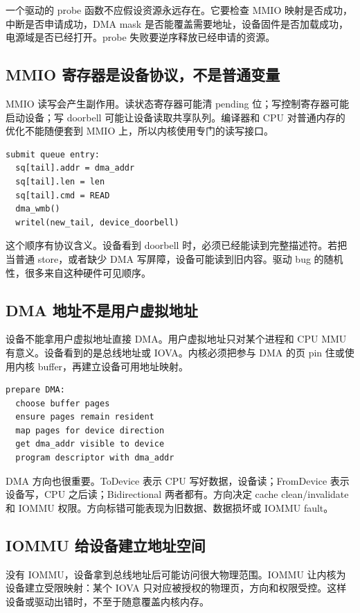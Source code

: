 一个驱动的 probe 函数不应假设资源永远存在。它要检查 MMIO 映射是否成功，中断是否申请成功，DMA mask 是否能覆盖需要地址，设备固件是否加载成功，电源域是否已经打开。probe 失败要逆序释放已经申请的资源。

\subsection{MMIO 寄存器是设备协议，不是普通变量}

MMIO 读写会产生副作用。读状态寄存器可能清 pending 位；写控制寄存器可能启动设备；写 doorbell 可能让设备读取共享队列。编译器和 CPU 对普通内存的优化不能随便套到 MMIO 上，所以内核使用专门的读写接口。

\begin{lstlisting}
submit queue entry:
  sq[tail].addr = dma_addr
  sq[tail].len = len
  sq[tail].cmd = READ
  dma_wmb()
  writel(new_tail, device_doorbell)
\end{lstlisting}

这个顺序有协议含义。设备看到 doorbell 时，必须已经能读到完整描述符。若把  当普通 store，或者缺少 DMA 写屏障，设备可能读到旧内容。驱动 bug 的随机性，很多来自这种硬件可见顺序。

\subsection{DMA 地址不是用户虚拟地址}

设备不能拿用户虚拟地址直接 DMA。用户虚拟地址只对某个进程和 CPU MMU 有意义。设备看到的是总线地址或 IOVA。内核必须把参与 DMA 的页 pin 住或使用内核 buffer，再建立设备可用地址映射。

\begin{lstlisting}
prepare DMA:
  choose buffer pages
  ensure pages remain resident
  map pages for device direction
  get dma_addr visible to device
  program descriptor with dma_addr
\end{lstlisting}

DMA 方向也很重要。ToDevice 表示 CPU 写好数据，设备读；FromDevice 表示设备写，CPU 之后读；Bidirectional 两者都有。方向决定 cache clean/invalidate 和 IOMMU 权限。方向标错可能表现为旧数据、数据损坏或 IOMMU fault。

\subsection{IOMMU 给设备建立地址空间}

没有 IOMMU，设备拿到总线地址后可能访问很大物理范围。IOMMU 让内核为设备建立受限映射：某个 IOVA 只对应被授权的物理页，方向和权限受控。这样设备或驱动出错时，不至于随意覆盖内核内存。

